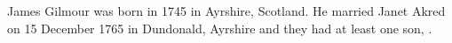 
James Gilmour was born in 1745 in Ayrshire, Scotland.\cite{JGbirth}
He married Janet Akred on 15 December 1765 in Dundonald, Ayrshire and they had at least one son, .
